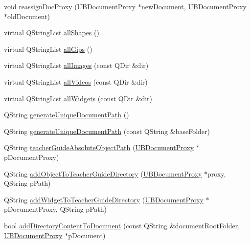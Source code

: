 \begin{DoxyCompactItemize}
\item 
void \hyperlink{class_u_b_persistence_manager_a3ae9e5749259cbbde2e4e3ede8b84713}{reassign\-Doc\-Proxy} (\hyperlink{class_u_b_document_proxy}{U\-B\-Document\-Proxy} $\ast$new\-Document, \hyperlink{class_u_b_document_proxy}{U\-B\-Document\-Proxy} $\ast$old\-Document)
\item 
virtual Q\-String\-List \hyperlink{class_u_b_persistence_manager_a930dab54f70136727669a6affc63d3a4}{all\-Shapes} ()
\item 
virtual Q\-String\-List \hyperlink{class_u_b_persistence_manager_a6516bded73f27ad772ab3da5c71de270}{all\-Gips} ()
\item 
virtual Q\-String\-List \hyperlink{class_u_b_persistence_manager_ae434e62944d681d75eb806de1e63d067}{all\-Images} (const Q\-Dir \&dir)
\item 
virtual Q\-String\-List \hyperlink{class_u_b_persistence_manager_a5b9b59f231ff8a55077661033f4c7a13}{all\-Videos} (const Q\-Dir \&dir)
\item 
virtual Q\-String\-List \hyperlink{class_u_b_persistence_manager_aa1084e84e2c19d79154bb425bb38626b}{all\-Widgets} (const Q\-Dir \&dir)
\item 
Q\-String \hyperlink{class_u_b_persistence_manager_a03e1d327109aaa0518419218cce9fbaf}{generate\-Unique\-Document\-Path} ()
\item 
Q\-String \hyperlink{class_u_b_persistence_manager_aa2c28ad3b3d850102dd65f780c14513a}{generate\-Unique\-Document\-Path} (const Q\-String \&base\-Folder)
\item 
Q\-String \hyperlink{class_u_b_persistence_manager_a0d029c2acb9d049c74b13701bb46e234}{teacher\-Guide\-Absolute\-Object\-Path} (\hyperlink{class_u_b_document_proxy}{U\-B\-Document\-Proxy} $\ast$p\-Document\-Proxy)
\item 
Q\-String \hyperlink{class_u_b_persistence_manager_ac5bb862a97a7da0f0e37c4d24dead09d}{add\-Object\-To\-Teacher\-Guide\-Directory} (\hyperlink{class_u_b_document_proxy}{U\-B\-Document\-Proxy} $\ast$proxy, Q\-String p\-Path)
\item 
Q\-String \hyperlink{class_u_b_persistence_manager_a3370b47b5038c6fe3aa2f82cbac49de4}{add\-Widget\-To\-Teacher\-Guide\-Directory} (\hyperlink{class_u_b_document_proxy}{U\-B\-Document\-Proxy} $\ast$p\-Document\-Proxy, Q\-String p\-Path)
\item 
bool \hyperlink{class_u_b_persistence_manager_a9d57436055dda09d3096d12039fe89a0}{add\-Directory\-Content\-To\-Document} (const Q\-String \&document\-Root\-Folder, \hyperlink{class_u_b_document_proxy}{U\-B\-Document\-Proxy} $\ast$p\-Document)

\end{DoxyCompactItemize}
